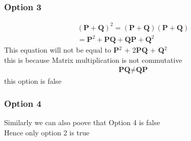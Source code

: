 \documentclass{beamer}
\begin{document}
\begin{frame}
\frametitle{Option 3}
\begin{align}
         (\textbf{P}+\textbf{Q})^2 = (\textbf{P}+\textbf{Q})(\textbf{P}+\textbf{Q})\\
          =  \textbf{P}^2 + \textbf{P}\textbf{Q} + \textbf{Q}\textbf{P} + \textbf{Q}^2
     \end{align}
     This equation will not be equal to \textbf{P}$^2$ + 2$\textbf{P}\textbf{Q}$ + \textbf{Q}$^2$\\
     this is because Matrix multiplication is not commutative 
     \begin{align}
         \textbf{P}\textbf{Q} \neq \textbf{Q}\textbf{P}
     \end{align}
     this option is false 

\end{frame}
\begin{frame}
\frametitle{Option 4}
Similarly we can also poove that Option 4 is false\\
Hence only option 2 is true
\end{frame}
\end{document}
